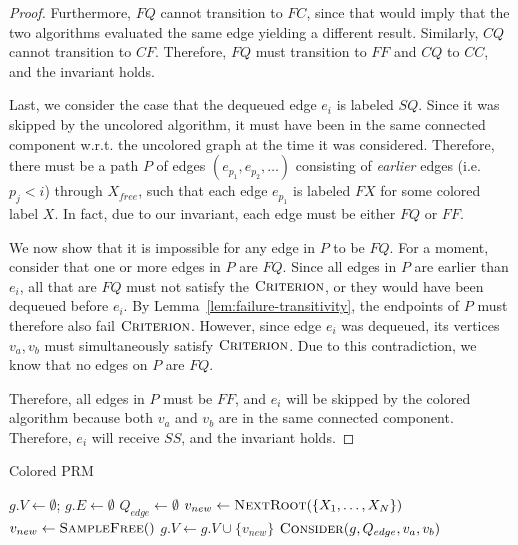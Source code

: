 \begin{proof}
Furthermore, $FQ$ cannot transition to $FC$, since that would imply
that the two algorithms evaluated the same edge yielding a different result.
Similarly, $CQ$ cannot transition to $CF$.
Therefore, $FQ$ must transition to $FF$
and $CQ$ to $CC$,
and the invariant holds.

Last, we consider the case that the dequeued edge
$e_i$ is labeled $SQ$.
Since it was skipped by the uncolored algorithm,
it must have been in the same connected component w.r.t. the uncolored
graph at the time it was considered.
Therefore, there must be a path $P$ of edges $(e_{p_1}, e_{p_2}, \dots)$
consisting of \emph{earlier} edges (i.e. $p_j < i$)
through $X_{free}$, such that each edge $e_{p_1}$ is labeled $FX$
for some colored label $X$.
In fact, due to our invariant, each edge must be either $FQ$ or $FF$.

We now show that it is impossible for any edge in $P$ to be $FQ$.
For a moment, consider that one or more edges in $P$ are $FQ$.
Since all edges in $P$ are earlier than $e_i$,
all that are $FQ$ must not satisfy the $\textsc{Criterion}$,
or they would have been dequeued before $e_i$.
By Lemma~\ref{lem:failure-transitivity},
the endpoints of $P$ must therefore also fail $\textsc{Criterion}$.
However, since edge $e_i$ was dequeued,
its vertices $v_a, v_b$ must simultaneously satisfy $\textsc{Criterion}$.
Due to this contradiction, we know that no edges on $P$ are $FQ$.

Therefore, all edges in $P$ must be $FF$,
and $e_i$ will be skipped by the colored algorithm
because both $v_a$ and $v_b$ are in the same connected component.
Therefore, $e_i$ will receive $SS$, and the invariant holds.
\end{proof}

\begin{algorithm*}[t]
\caption{Colored PRM}
\begin{algorithmic}[1]
\State $g.V \leftarrow \emptyset$; $g.E \leftarrow \emptyset$
\State $Q_{edge} \leftarrow \emptyset$
   \label{line:empty-queue}%
   \label{line:roots-not-added}%
\State $v_{new} \leftarrow \mbox{\textsc{NextRoot}}(\{X_1, \dots, X_N\})$
   \label{line:add-root}%
\Else
\State $v_{new} \leftarrow \mbox{\textsc{SampleFree}}()$
   \label{line:sample}%
\EndIf
\State $g.V \leftarrow g.V \cup \{ v_{new} \}$
   \label{line:island-add}%
   \label{line:nearby}%
\State $\mbox{\textsc{Consider}}(g, Q_{edge}, v_a, v_b)$%
   \label{line:consider}%
\EndFor
\EndWhile
\EndProcedure
\end{algorithmic}
\label{alg:colored-prm}
\end{algorithm*}


